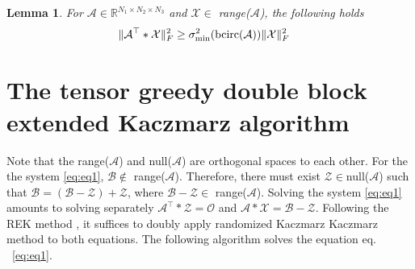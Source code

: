 \documentclass[11pt]{article}
\newtheorem{lemma}[theorem]{Lemma}
\def\fm#1{\mathcal{#1}}
\def\r{\mathbb{R}}
\begin{document}
\begin{lemma}\label{lem:lem-12}
For $\fm A\in \r^{N_1\times N_2\times N_3}$ and $\fm X\in $ range($\fm A$),  the following holds 
\begin{align}
    \Vert \fm A^\top * \fm X \Vert_F^2 &  \geq \sigma_{\min}^2(\bcirc(\fm A))\Vert \fm X \Vert_F^2
\end{align}
\end{lemma}

\section{The tensor greedy double block extended Kaczmarz algorithm}\label{sec:tdgbek}

Note that the range($\fm A $) and null($\fm A$) are orthogonal spaces to each other. For the the system  \eqref{eq:eq1}, $\fm B \notin$ range($\fm A $). Therefore, there must exist $\fm Z \in $null($\fm A$) such that $\fm B= (\fm B - \fm Z )  + \fm Z $, where $\fm B- \fm Z \in $ range($\fm A$). Solving the system \eqref{eq:eq1}  amounts to solving separately $\fm A^\top * \fm Z = \fm O$ and $\fm A* \fm X = \fm B - \fm Z$. Following the REK method \cite{zouzias2013rando}, it suffices to doubly apply randomized Kaczmarz Kaczmarz method to both equations. The following algorithm solves the equation eq. ~\eqref{eq:eq1}.

\end{document}
